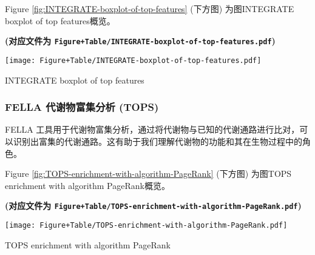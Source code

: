 \documentclass[
]{article}
\begin{document}
\begin{center}\vspace{1.5cm}\end{center}

\begin{center}\vspace{1.5cm}\end{center}

Figure \ref{fig:INTEGRATE-boxplot-of-top-features} (下方图) 为图INTEGRATE boxplot of top features概览。

\textbf{(对应文件为 \texttt{Figure+Table/INTEGRATE-boxplot-of-top-features.pdf})}

\def\@captype{figure}
\begin{center}
\texttt{[image: Figure+Table/INTEGRATE-boxplot-of-top-features.pdf]}
\caption{INTEGRATE boxplot of top features}\label{fig:INTEGRATE-boxplot-of-top-features}
\end{center}

\begin{center}\vspace{1.5cm}\end{center}

\hypertarget{fella-ux4ee3ux8c22ux7269ux5bccux96c6ux5206ux6790-tops}{%
\subsubsection{FELLA 代谢物富集分析 (TOPS)}\label{fella-ux4ee3ux8c22ux7269ux5bccux96c6ux5206ux6790-tops}}

FELLA 工具用于代谢物富集分析，通过将代谢物与已知的代谢通路进行比对，可以识别出富集的代谢通路。这有助于我们理解代谢物的功能和其在生物过程中的角色。

\begin{center}\vspace{1.5cm}\end{center}

Figure \ref{fig:TOPS-enrichment-with-algorithm-PageRank} (下方图) 为图TOPS enrichment with algorithm PageRank概览。

\textbf{(对应文件为 \texttt{Figure+Table/TOPS-enrichment-with-algorithm-PageRank.pdf})}

\def\@captype{figure}
\begin{center}
\texttt{[image: Figure+Table/TOPS-enrichment-with-algorithm-PageRank.pdf]}
\caption{TOPS enrichment with algorithm PageRank}\label{fig:TOPS-enrichment-with-algorithm-PageRank}
\end{center}
\end{document}
